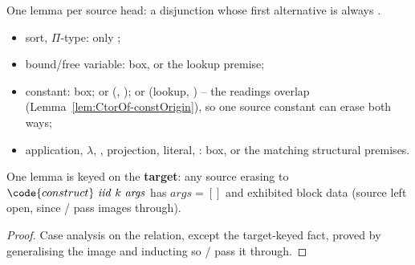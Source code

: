 \begin{lemma}
\label{lem:Erases-sort_inv}
\leanok
{}
 One lemma per source head: a disjunction whose first alternative is always \hl{}.
\begin{itemize}
\item sort, $\Pi$-type: only ;
\item bound/free variable: box, or the lookup premise;
\item constant: box; or  (, ); or  (lookup, ) -- the readings overlap (Lemma~\ref{lem:CtorOf-constOrigin}), so one source constant can erase both ways;
\item application, $\lambda$, , projection, literal, : box, or the matching structural premises.
\end{itemize}
 One lemma is keyed on the \textbf{target}: any source erasing to $\code{construct}\ \mathit{iid}\ k\ \mathit{args}$ has $\mathit{args}=[]$ and exhibited block data (source left open, since / pass images through).
\end{lemma}
\begin{proof}
\leanok
{}
 Case analysis on the relation, except the target-keyed fact, proved by generalising the image and inducting so / pass it through.
\end{proof}


